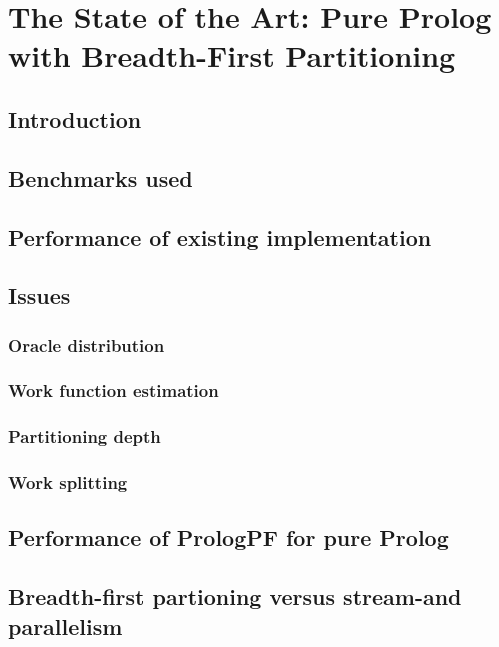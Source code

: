 \chapter{The State of the Art: Pure Prolog with Breadth-First Partitioning} 
\label{bfp_depth}

\section{Introduction}

\section{Benchmarks used}

\section{Performance of existing implementation}

\section{Issues}

\subsection{Oracle distribution}

\subsection{Work function estimation}

\subsection{Partitioning depth}

\subsection{Work splitting}

\section{Performance of PrologPF for pure Prolog}

\section{Breadth-first partioning versus stream-and parallelism}

